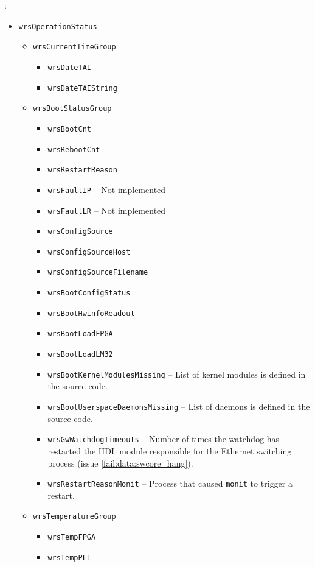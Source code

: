:
\begin{itemize}
  \item \texttt{wrsOperationStatus}
    \begin{itemize}
      \item \texttt{wrsCurrentTimeGroup}
	\begin{itemize}
	  \item \texttt{wrsDateTAI}
	  \item \texttt{wrsDateTAIString}
	\end{itemize}
      \item \texttt{wrsBootStatusGroup}
	\begin{itemize}
	  \item \texttt{wrsBootCnt}
	  \item \texttt{wrsRebootCnt}
	  \item \texttt{wrsRestartReason}
	  \item \texttt{wrsFaultIP} -- Not implemented
	  \item \texttt{wrsFaultLR} -- Not implemented
	  \item \texttt{wrsConfigSource}
	  \item \texttt{wrsConfigSourceHost}
	  \item \texttt{wrsConfigSourceFilename}
	  \item \texttt{wrsBootConfigStatus}
	  \item \texttt{wrsBootHwinfoReadout}
	  \item \texttt{wrsBootLoadFPGA}
	  \item \texttt{wrsBootLoadLM32}
	  \item \texttt{wrsBootKernelModulesMissing} -- List of kernel modules is
	    defined in the source code.
	  \item \texttt{wrsBootUserspaceDaemonsMissing} -- List of daemons is defined
	    in the source code.
	  \item \texttt{wrsGwWatchdogTimeouts} -- Number of times the watchdog has
	    restarted the HDL module responsible for the Ethernet switching process
	    (issue \ref{fail:data:swcore_hang}).
	  \item \texttt{wrsRestartReasonMonit} -- Process that caused \texttt{monit}
	    to trigger a restart.
	\end{itemize}
      \item \texttt{wrsTemperatureGroup}
	\begin{itemize}
	  \item \texttt{wrsTempFPGA}
	  \item \texttt{wrsTempPLL}

\end{itemize}
\end{itemize}
\end{itemize}
